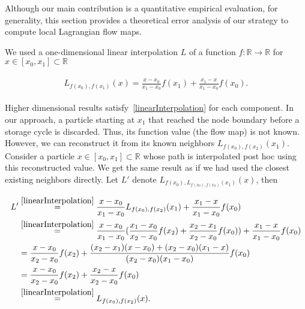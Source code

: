 %
Although our main contribution is a quantitative empirical evaluation, for generality, this section provides a theoretical error analysis of our strategy to compute local Lagrangian flow maps.
%

We used a one-dimensional linear interpolation $L$ of a function $f:\mathbb R\to \mathbb R$ for $x\in[x_0,x_1]\subset\mathbb R$
%
\begin{footnotesize}
\begin{eqnarray}
\begin{aligned}\label{linearInterpolation}
L_{f(x_0),f(x_1)}(x) = \frac{x-x_0}{x_1-x_0}f(x_1) + \frac{x_1-x}{x_1-x_0}f(x_0).
\end{aligned}
\end{eqnarray}
\end{footnotesize}
%
Higher dimensional results satisfy~\eqref{linearInterpolation} for each component.
In our approach, a particle starting at $x_1$ that reached the node boundary before a storage cycle is discarded.
%
Thus, its function value (the flow map) is not known. 
%
However, we can reconstruct it from its known neighbors $L_{f(x_0),f(x_2)}(x_1)$. 
%
Consider a particle $x\in[x_0,x_1]\subset\mathbb R$ whose path is interpolated post hoc using this reconstructed value. 
%
We get the same result as if we had used the closest existing neighbors directly. Let $L'$ denote $L_{f(x_0),L_{f(x_0),f(x_2)}(x_1)}(x)$, then
%
\begin{footnotesize}
\begin{eqnarray}
\begin{aligned}\label{doubleInterpolation}
L' &\overset{\eqref{linearInterpolation}}= \frac{x-x_0}{x_1-x_0}L_{f(x_0),f(x_2)}(x_1) + \frac{x_1-x}{x_1-x_0}f(x_0)\\
&\overset{\eqref{linearInterpolation}}= \frac{x-x_0}{x_1-x_0}(\frac{x_1-x_0}{x_2-x_0}f(x_2) + \frac{x_2-x_1}{x_2-x_0}f(x_0)) + \frac{x_1-x}{x_1-x_0}f(x_0)\\
&= \frac{x-x_0}{x_2-x_0}f(x_2) + \frac{(x_2-x_1)(x-x_0)+(x_2-x_0)(x_1-x)}{(x_2-x_0)(x_1-x_0)} f(x_0)\\
&= \frac{x-x_0}{x_2-x_0}f(x_2) + \frac{x_2-x}{x_2-x_0}f(x_0)\\
&\overset{\eqref{linearInterpolation}}= L_{f(x_0),f(x_2)}(x).
\end{aligned}
\end{eqnarray}
\end{footnotesize}
